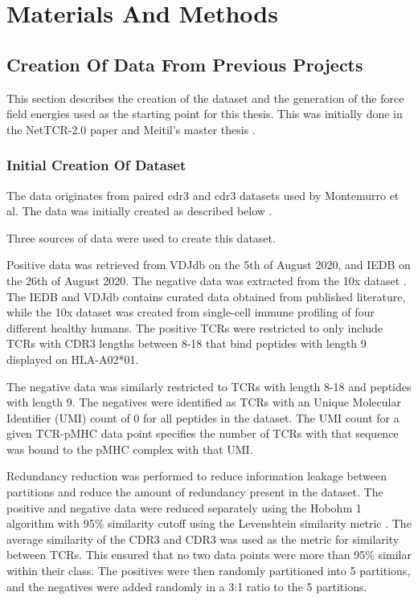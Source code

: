 \section{Materials And Methods} \label{materials}

\subsection{Creation Of Data From Previous Projects}
This section describes the creation of the dataset and the generation of the force field energies used as the starting point for this thesis. This was initially done in the NetTCR-2.0 paper and Meitil's master thesis \cite{Montemurro2021NetTCR-2.0Data, Meitil2021UsingPrediction}.

\subsubsection{Initial Creation Of Dataset} \label{alessandro_data}
The data originates from paired \acs{cdr}3{\textalpha} and \acs{cdr}3{\textbeta} datasets used by Montemurro et al. The data was initially created as described below \cite{Montemurro2021NetTCR-2.0Data}.

Three sources of data were used to create this dataset.

Positive data was retrieved from VDJdb \cite{Bagaev2020VDJdbCompendium} on the 5th of August 2020, and  IEDB \cite{Vita2015The3.0} on the 26th of August 2020. The negative data was extracted from the 10x dataset \cite{10XGenomics2019APhenotype}. The IEDB and VDJdb contains curated data obtained from published literature, while the 10x dataset was created from single-cell immune profiling of four different healthy humans. The positive TCRs were restricted to only include TCRs with CDR3 lengths between 8-18 that bind peptides with length 9 displayed on HLA-A02*01. 

The negative data was similarly restricted to TCRs with length 8-18 and peptides with length 9. The negatives were identified as TCRs with an Unique Molecular Identifier (UMI) count of 0 for all peptides in the dataset. The UMI count for a given TCR-pMHC data point specifies the number of TCRs with that sequence was bound to the pMHC complex with that UMI.

Redundancy reduction was performed to reduce information leakage between partitions and reduce the amount of redundancy present in the dataset. The positive and negative data were reduced separately using the Hobohm 1 algorithm \cite{Hobohm1992SelectionSets} with 95\% similarity cutoff using the Levenshtein similarity metric \cite{Montemurro2021NetTCR-2.0Data}. The average similarity of the CDR3{\textalpha} and CDR3{\textbeta} was used as the metric for similarity between TCRs. This ensured that no two data points were more than 95\% similar within their class. The positives were then randomly partitioned into 5 partitions, and the negatives were added randomly in a 3:1 ratio to the 5 partitions.


